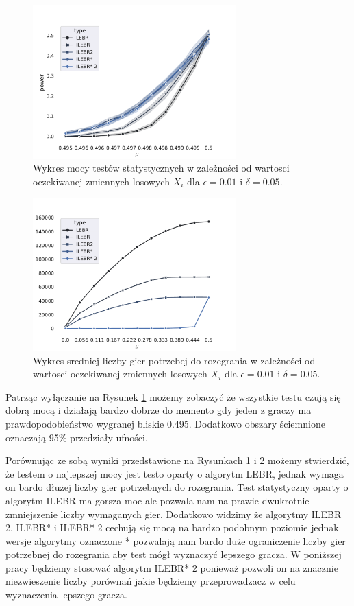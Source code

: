 \documentclass[inzynierska]{pwr_wmat_praca_dyplomowa}
\theoremstyle{plain}
\numberwithin{theorem}{chapter}
\theoremstyle{definition}
\numberwithin{theorem}{chapter}
\begin{document}
	\begin{figure}
		\centering
		\includegraphics[width=0.7\textwidth]{imagens/test_powrs.pdf}
		\caption{Wykres mocy testów statystycznych w zależności od wartosci oczekiwanej zmiennych losowych  $X_i$ dla $\epsilon=0.01$ i $\delta = 0.05$.}
		\label{fig:test_powrs}
	\end{figure}
	\begin{figure}
		\centering
		\includegraphics[width=0.7\textwidth]{imagens/needed_games_to_play.pdf}
		\caption{Wykres sredniej liczby gier potrzebej do rozegrania w zależności od wartosci oczekiwanej zmiennych losowych  $X_i$ dla $\epsilon=0.01$ i $\delta = 0.05$.}
		\label{fig:needed_games_to_play}
	\end{figure}
	Patrząc wyłączanie na Rysunek \ref{fig:test_powrs} możemy zobaczyć że wszystkie testu czują się dobrą mocą i działają bardzo dobrze do memento gdy jeden z graczy ma prawdopodobieństwo wygranej bliskie 0.495. Dodatkowo obszary ściemnione oznaczają 95\% przedziały ufności.
	
	
	Porównując ze sobą wyniki przedstawione na Rysunkach \ref{fig:test_powrs} i \ref{fig:needed_games_to_play} możemy stwierdzić, że testem o
	najlepszej mocy jest testo oparty o algorytm LEBR, jednak wymaga on bardo dłużej liczby gier potrzebnych do rozegrania.
	Test statystyczny oparty o algorytm ILEBR ma gorsza moc ale pozwala nam na prawie dwukrotnie zmniejszenie liczby wymaganych gier. Dodatkowo widzimy że algorytmy  ILEBR 2, ILEBR* i ILEBR* 2 cechują się mocą na bardzo podobnym poziomie jednak wersje algorytmy oznaczone * pozwalają nam bardo duże ograniczenie liczby gier potrzebnej do rozegrania aby test mógł wyznaczyć lepszego gracza. W poniższej pracy będziemy stosować algorytm ILEBR* 2 ponieważ pozwoli on na znacznie niezwieszenie liczby porównań jakie będziemy przeprowadzacz w celu wyznaczenia lepszego gracza. 
	
\end{document}

